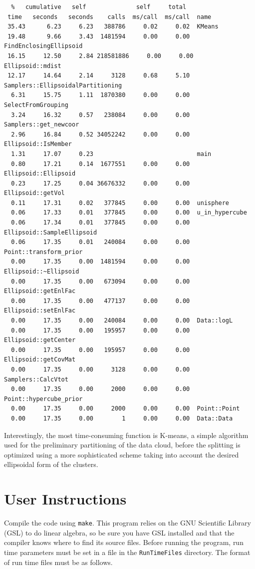 \documentclass{article}
\begin{document}
\begin{verbatim}
  %   cumulative   self              self     total           
 time   seconds   seconds    calls  ms/call  ms/call  name    
 35.43      6.23     6.23   388786     0.02     0.02  KMeans
 19.48      9.66     3.43  1481594     0.00     0.00  FindEnclosingEllipsoid
 16.15     12.50     2.84 218581886     0.00     0.00  Ellipsoid::mdist
 12.17     14.64     2.14     3128     0.68     5.10  Samplers::EllipsoidalPartitioning
  6.31     15.75     1.11  1870380     0.00     0.00  SelectFromGrouping
  3.24     16.32     0.57   238084     0.00     0.00  Samplers::get_newcoor
  2.96     16.84     0.52 34052242     0.00     0.00  Ellipsoid::IsMember
  1.31     17.07     0.23                             main
  0.80     17.21     0.14  1677551     0.00     0.00  Ellipsoid::Ellipsoid
  0.23     17.25     0.04 36676332     0.00     0.00  Ellipsoid::getVol
  0.11     17.31     0.02   377845     0.00     0.00  unisphere
  0.06     17.33     0.01   377845     0.00     0.00  u_in_hypercube
  0.06     17.34     0.01   377845     0.00     0.00  Ellipsoid::SampleEllipsoid
  0.06     17.35     0.01   240084     0.00     0.00  Point::transform_prior
  0.00     17.35     0.00  1481594     0.00     0.00  Ellipsoid::~Ellipsoid
  0.00     17.35     0.00   673094     0.00     0.00  Ellipsoid::getEnlFac
  0.00     17.35     0.00   477137     0.00     0.00  Ellipsoid::setEnlFac
  0.00     17.35     0.00   240084     0.00     0.00  Data::logL
  0.00     17.35     0.00   195957     0.00     0.00  Ellipsoid::getCenter
  0.00     17.35     0.00   195957     0.00     0.00  Ellipsoid::getCovMat
  0.00     17.35     0.00     3128     0.00     0.00  Samplers::CalcVtot
  0.00     17.35     0.00     2000     0.00     0.00  Point::hypercube_prior
  0.00     17.35     0.00     2000     0.00     0.00  Point::Point
  0.00     17.35     0.00        1     0.00     0.00  Data::Data
\end{verbatim}
Interestingly, the most time-consuming function is K-means, a simple algorithm used for the preliminary partitioning of the data cloud, before the splitting is optimized using a more sophisticated scheme taking into account the desired ellipsoidal form of the clusters.
\section{User Instructions}
Compile the code using {\tt make}.  This program relies on the GNU Scientific Library (GSL) to do linear algebra, so be sure  you have GSL installed and that the compiler knows where to find its source files. Before running the program, run time parameters must be set in a file in the {\tt RunTimeFiles} directory. The format of run time files must be as follows. 
\end{document}
